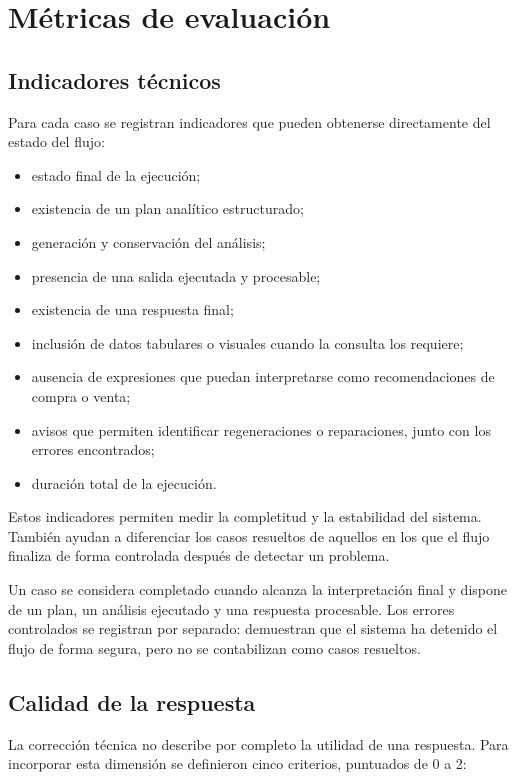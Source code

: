\section{Métricas de evaluación}

\subsection{Indicadores técnicos}

Para cada caso se registran indicadores que pueden obtenerse directamente del estado del flujo:

\begin{itemize}
    \item estado final de la ejecución;
    \item existencia de un plan analítico estructurado;
    \item generación y conservación del análisis;
    \item presencia de una salida ejecutada y procesable;
    \item existencia de una respuesta final;
    \item inclusión de datos tabulares o visuales cuando la consulta los requiere;
    \item ausencia de expresiones que puedan interpretarse como recomendaciones de compra o venta;
    \item avisos que permiten identificar regeneraciones o reparaciones, junto con los errores encontrados;
    \item duración total de la ejecución.
\end{itemize}

Estos indicadores permiten medir la completitud y la estabilidad del sistema. También ayudan a diferenciar los casos resueltos de aquellos en los que el flujo finaliza de forma controlada después de detectar un problema.

Un caso se considera completado cuando alcanza la interpretación final y dispone de un plan, un análisis ejecutado y una respuesta procesable. Los errores controlados se registran por separado: demuestran que el sistema ha detenido el flujo de forma segura, pero no se contabilizan como casos resueltos.

\subsection{Calidad de la respuesta}

La corrección técnica no describe por completo la utilidad de una respuesta. Para incorporar esta dimensión se definieron cinco criterios, puntuados de 0 a 2:

